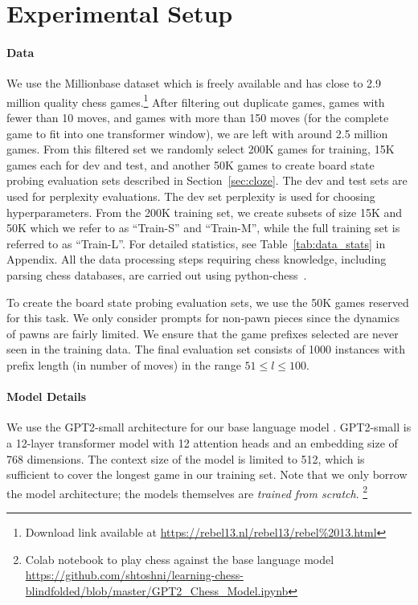 \section{Experimental Setup}
\label{sec:setup}

\paragraph{Data}
We use the Millionbase dataset which is freely available and has close to 2.9 million quality chess games.\footnote{Download link available at \url{https://rebel13.nl/rebel13/rebel\%2013.html}}
After filtering out duplicate games, games with
fewer than 10 moves, and games with
more than 150 moves (for the complete game to fit into one transformer window), we are left with around 2.5 million games.
From this filtered set we randomly select 200K games for training, 15K games each for dev and test, and another 50K games to create board state probing evaluation sets described in Section~\ref{sec:cloze}.
The dev and test sets are used for perplexity evaluations. 
The dev set perplexity is used for choosing hyperparameters.
From the 200K training set, we create subsets of size 15K and 50K which we refer to as ``Train-S'' and ``Train-M'', while the full training set is referred to as ``Train-L''.
For detailed statistics, see Table~\ref{tab:data_stats} in Appendix.
All the data processing steps requiring chess knowledge, including parsing chess databases, are carried out using python-chess~\citep{python-chess}.

To create the board state probing evaluation sets, we use the 50K games reserved for this task. %
We only consider prompts for non-pawn pieces since the dynamics of pawns are fairly limited.
We ensure that the game prefixes selected are never seen in the training data.
The final evaluation set consists of 1000 instances with prefix length (in number of moves) in the range $51 \le l \le 100$.





\paragraph{Model Details}
We use the GPT2-small architecture for our base language model \citep{vaswani2017attention,radford2019language}.
GPT2-small is a 12-layer transformer model with 12 attention heads and an embedding size of 768 dimensions.
The context size of the model is limited to 512, which is sufficient to cover the longest game in our training set.
Note that we only borrow the model architecture; the models themselves are \emph{trained from scratch}.
\footnote{Colab notebook to play chess against the base language model \url{https://github.com/shtoshni/learning-chess-blindfolded/blob/master/GPT2_Chess_Model.ipynb}}


